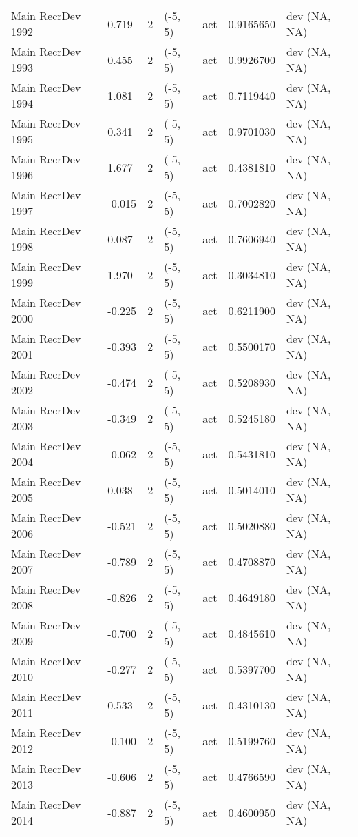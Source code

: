 \documentclass[11pt,
  english,
  letterpaper,
]{article}
\begin{document}
\begin{landscape}
\begin{longtable}[t]{>{\raggedright\arraybackslash}p{6cm}lllll>{\raggedright\arraybackslash}p{4cm}}
Main RecrDev 1992 & 0.719 & 2 & (-5, 5) & act & 0.9165650 & dev (NA, NA)\\
Main RecrDev 1993 & 0.455 & 2 & (-5, 5) & act & 0.9926700 & dev (NA, NA)\\
Main RecrDev 1994 & 1.081 & 2 & (-5, 5) & act & 0.7119440 & dev (NA, NA)\\
Main RecrDev 1995 & 0.341 & 2 & (-5, 5) & act & 0.9701030 & dev (NA, NA)\\
Main RecrDev 1996 & 1.677 & 2 & (-5, 5) & act & 0.4381810 & dev (NA, NA)\\
Main RecrDev 1997 & -0.015 & 2 & (-5, 5) & act & 0.7002820 & dev (NA, NA)\\
Main RecrDev 1998 & 0.087 & 2 & (-5, 5) & act & 0.7606940 & dev (NA, NA)\\
Main RecrDev 1999 & 1.970 & 2 & (-5, 5) & act & 0.3034810 & dev (NA, NA)\\
Main RecrDev 2000 & -0.225 & 2 & (-5, 5) & act & 0.6211900 & dev (NA, NA)\\
Main RecrDev 2001 & -0.393 & 2 & (-5, 5) & act & 0.5500170 & dev (NA, NA)\\
Main RecrDev 2002 & -0.474 & 2 & (-5, 5) & act & 0.5208930 & dev (NA, NA)\\
Main RecrDev 2003 & -0.349 & 2 & (-5, 5) & act & 0.5245180 & dev (NA, NA)\\
Main RecrDev 2004 & -0.062 & 2 & (-5, 5) & act & 0.5431810 & dev (NA, NA)\\
Main RecrDev 2005 & 0.038 & 2 & (-5, 5) & act & 0.5014010 & dev (NA, NA)\\
Main RecrDev 2006 & -0.521 & 2 & (-5, 5) & act & 0.5020880 & dev (NA, NA)\\
Main RecrDev 2007 & -0.789 & 2 & (-5, 5) & act & 0.4708870 & dev (NA, NA)\\
Main RecrDev 2008 & -0.826 & 2 & (-5, 5) & act & 0.4649180 & dev (NA, NA)\\
Main RecrDev 2009 & -0.700 & 2 & (-5, 5) & act & 0.4845610 & dev (NA, NA)\\
Main RecrDev 2010 & -0.277 & 2 & (-5, 5) & act & 0.5397700 & dev (NA, NA)\\
Main RecrDev 2011 & 0.533 & 2 & (-5, 5) & act & 0.4310130 & dev (NA, NA)\\
Main RecrDev 2012 & -0.100 & 2 & (-5, 5) & act & 0.5199760 & dev (NA, NA)\\
Main RecrDev 2013 & -0.606 & 2 & (-5, 5) & act & 0.4766590 & dev (NA, NA)\\
Main RecrDev 2014 & -0.887 & 2 & (-5, 5) & act & 0.4600950 & dev (NA, NA)\\

\end{longtable}
\end{landscape}
\end{document}
